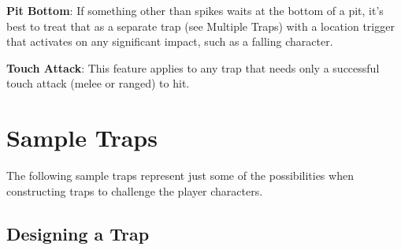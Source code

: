 \textbf{Pit Bottom}: If something other than spikes waits at the bottom of a pit, it's best to treat that as a separate trap (see Multiple Traps) with a location trigger that activates on any significant impact, such as a falling character. 
				
\textbf{Touch Attack}: This feature applies to any trap that needs only a successful touch attack (melee or ranged) to hit.
				
\section{Sample Traps}

				
The following sample traps represent just some of the possibilities when constructing traps to challenge the player characters.



\subsection{Designing a Trap}

